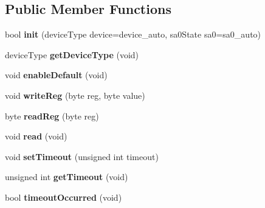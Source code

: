 \subsection*{Public Member Functions}
\begin{DoxyCompactItemize}
\item 
\mbox{\label{class_l3_g_aaf0cde569c56ef9c477c988e576cae2f}} 
bool {\bfseries init} (device\+Type device=device\+\_\+auto, sa0\+State sa0=sa0\+\_\+auto)
\item 
\mbox{\label{class_l3_g_ac90914a20c299e40df22e8faa1345cb2}} 
device\+Type {\bfseries get\+Device\+Type} (void)
\item 
\mbox{\label{class_l3_g_a13d55a9eeded2066b4c55b549b071795}} 
void {\bfseries enable\+Default} (void)
\item 
\mbox{\label{class_l3_g_a5a8c94bde9f1418843e884c5a1733bd6}} 
void {\bfseries write\+Reg} (byte reg, byte value)
\item 
\mbox{\label{class_l3_g_a2ca79c265af0fd19839907f435ba877b}} 
byte {\bfseries read\+Reg} (byte reg)
\item 
\mbox{\label{class_l3_g_a2e62c189d349ecfe8d510151d3a2508c}} 
void {\bfseries read} (void)
\item 
\mbox{\label{class_l3_g_a5edf6fb285ab31ef54cf0252d2e2e9b7}} 
void {\bfseries set\+Timeout} (unsigned int timeout)
\item 
\mbox{\label{class_l3_g_a78596ed57ac529f122ad2c88116e67a4}} 
unsigned int {\bfseries get\+Timeout} (void)
\item 
\mbox{\label{class_l3_g_a6ce276e7ccc180b0d8bec8e59511ce4f}} 
bool {\bfseries timeout\+Occurred} (void)
\end{DoxyCompactItemize}
